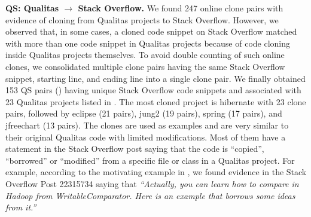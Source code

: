 \documentclass[10pt,journal,compsoc]{IEEEtran}
\begin{document}
\textbf{QS: Qualitas $\rightarrow$ Stack Overflow.} We found 247 online clone
pairs with evidence of cloning from Qualitas projects to Stack Overflow.
However, we observed that, in some cases, a cloned code snippet on Stack
Overflow matched with more than one code snippet in Qualitas projects because of
code cloning inside Qualitas projects themselves. To avoid double counting of
such online clones, we consolidated multiple clone pairs having the same Stack
Overflow snippet, starting line, and ending line into a single clone pair. We
finally obtained 153 QS pairs () having unique Stack Overflow code snippets and
associated with 23 Qualitas projects listed in .
The most cloned project is \textsf{hibernate} with 23
clone pairs, followed by \textsf{eclipse} (21 pairs), \textsf{jung2} (19 pairs),
\textsf{spring} (17 pairs), and \textsf{jfreechart} (13 pairs). The clones are
used as examples and are very similar to their original Qualitas code with
limited modifications. Most of them have a statement in the Stack Overflow post
saying that the code is ``copied'', ``borrowed'' or ``modified'' from a specific
file or class in a Qualitas project. For example, according to the motivating
example in , we found evidence in the Stack Overflow Post
22315734 saying that \textit{``Actually, you can learn how to compare in Hadoop
from WritableComparator. Here is an example that borrows some ideas from it.''}
\end{document}
